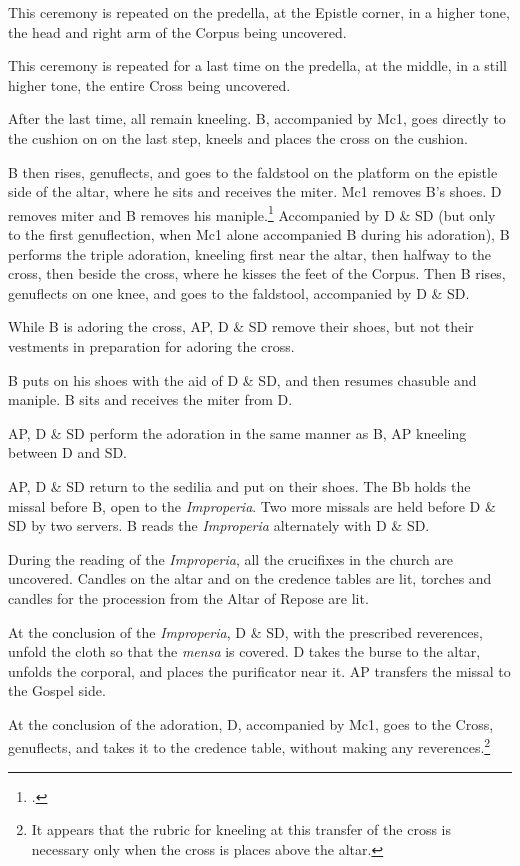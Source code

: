 {\rubric This ceremony is repeated on the predella, at the Epistle corner, in a
higher tone, the head and right arm of the Corpus being uncovered.

\rubric This ceremony is repeated for a last time on the predella, at the
middle, in a still higher tone, the entire Cross being uncovered.

\rubric After the last time, all remain kneeling. B, accompanied by Mc1, goes
directly to the cushion on on the last step, kneels and places the cross on the
cushion.

\rubric B then rises, genuflects, and goes to the faldstool on the platform on
the epistle side of the altar, where he sits and receives the miter. Mc1
removes B's shoes. D removes miter and B removes his maniple.\footcite[][p.
204, note 6.]{stehle} Accompanied by D \& SD (but only to the first
genuflection, when Mc1 alone accompanied B during his adoration), B performs
the triple adoration, kneeling first near the altar, then halfway to the cross,
then beside the cross, where he kisses the feet of the Corpus. Then B rises,
genuflects on one knee, and goes to the faldstool, accompanied by D \& SD.

\rubric While B is adoring the cross, AP, D \& SD remove their shoes, but not
their vestments in preparation for adoring the cross.

\rubric  B puts on his shoes with the aid of D \& SD, and then resumes chasuble and
maniple. B sits and receives the miter from D. 

\rubric AP, D \& SD perform the adoration in the same manner as B, AP kneeling
between D and SD.

\rubric AP, D \& SD return to the sedilia and put on their shoes. The Bb holds the
missal before B, open to the \textit{Improperia}. Two more missals are held
before D \& SD by two servers. B reads the \textit{Improperia} alternately with
D \& SD.

\rubric During the reading of the \textit{Improperia}, all the crucifixes in
the church are uncovered. Candles on the altar and on the credence tables are
lit, torches and candles for the procession from the Altar of Repose are lit.

\rubric At the conclusion of the \textit{Improperia}, D \& SD, with the
prescribed reverences, unfold the cloth so that the \textit{mensa} is covered.
D takes the burse to the altar, unfolds the corporal, and places the
purificator near it. AP transfers the missal to the Gospel side.

\rubric At the conclusion of the adoration, D, accompanied by Mc1, goes to the
Cross, genuflects, and takes it to the credence table, without making any
reverences.\footnote{It appears that the rubric for kneeling at this transfer
of the cross is necessary only when the cross is places above the altar.}

}
